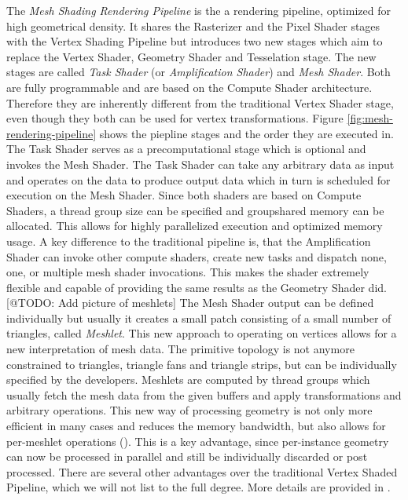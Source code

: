 The \emph{Mesh Shading Rendering Pipeline} is the a rendering pipeline, optimized for high geometrical 
density. It shares the Rasterizer and the Pixel Shader stages with the Vertex Shading Pipeline but 
introduces two new stages which aim to replace the Vertex Shader, Geometry Shader and Tesselation stage.
The new stages are called \emph{Task Shader} (or \emph{Amplification Shader}) and \emph{Mesh Shader}. Both 
are fully programmable and are based on the Compute Shader architecture. Therefore they are inherently different 
from the traditional Vertex Shader stage, even though they both can be used for vertex transformations.
Figure \ref{fig:mesh-rendering-pipeline} shows the piepline stages and the order they are executed in. \\

\noindent
The Task Shader serves as a precomputational stage which is optional and invokes the Mesh Shader.
The Task Shader can take any arbitrary data as input and operates on the data to produce output data which in 
turn is scheduled for execution on the Mesh Shader. Since both shaders are based on Compute Shaders, a thread 
group size can be specified and groupshared memory can be allocated. This allows for highly parallelized execution 
and optimized memory usage. A key difference to the traditional pipeline is, that the Amplification Shader can 
invoke other compute shaders, create new tasks and dispatch none, one, or multiple mesh shader invocations. This 
makes the shader extremely flexible and capable of providing the same results as the Geometry Shader did.\\

[@TODO: Add picture of meshlets]
\noindent
The Mesh Shader output can be defined individually but usually it creates a small patch consisting of a small 
number of triangles, called \emph{Meshlet}. This new approach to operating on vertices allows for a new interpretation 
of mesh data. The primitive topology is not anymore constrained to triangles, triangle fans and triangle strips, 
but can be individually specified by the developers.
Meshlets are computed by thread groups which usually fetch the mesh data from the given buffers and apply 
transformations and arbitrary operations. This new way of processing geometry is not only more efficient in many cases 
and reduces the memory bandwidth, but also allows for per-meshlet operations (\cite{Kubisch2020}). This is a key 
advantage, since per-instance geometry can now be processed in parallel and still be individually discarded or post 
processed. There are several other advantages over the traditional Vertex Shaded Pipeline, which we will not list to 
the full degree. More details are provided in \cite{Kubisch2020}.\\


